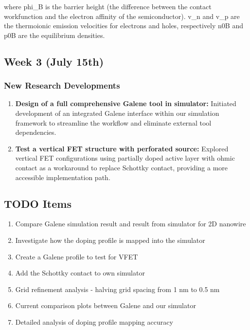 \documentclass{article}
\begin{document}
where phi_B is the barrier height (the difference between the contact workfunction and the electron affinity of the semiconductor). v_n and v_p are the thermoionic emission velocities for electrons and holes, respectively n0B and p0B are the equilibrium densities.




\subsection{Week 3 (July 15th)}




\subsubsection{New Research Developments}
\begin{enumerate}
    \item \textbf{Design of a full comprehensive Galene tool in simulator:} Initiated development of an integrated Galene interface within our simulation framework to streamline the workflow and eliminate external tool dependencies.

    \item \textbf{Test a vertical FET structure with perforated source:} Explored vertical FET configurations using partially doped active layer with ohmic contact as a workaround to replace Schottky contact, providing a more accessible implementation path.
\end{enumerate}

\subsection{TODO Items}
\begin{enumerate}
    \item Compare Galene simulation result and result from simulator for 2D nanowire
    \item Investigate how the doping profile is mapped into the simulator
    \item Create a Galene profile to test for VFET
    \item Add the Schottky contact to own simulator
    \item Grid refinement analysis - halving grid spacing from 1 nm to 0.5 nm
    \item Current comparison plots between Galene and our simulator
    \item Detailed analysis of doping profile mapping accuracy
\end{enumerate}
\end{document}
